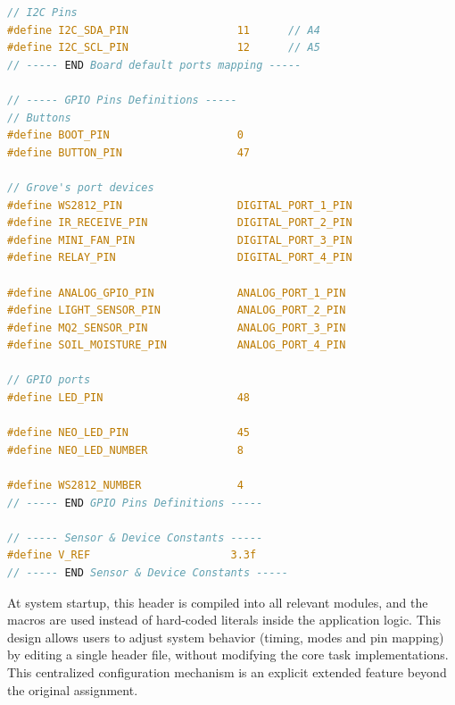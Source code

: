 \begin{lstlisting}[language=C,caption={Excerpt of configuration macros}]
// I2C Pins
#define I2C_SDA_PIN                 11      // A4
#define I2C_SCL_PIN                 12      // A5
// ----- END Board default ports mapping -----

// ----- GPIO Pins Definitions -----
// Buttons
#define BOOT_PIN                    0
#define BUTTON_PIN                  47

// Grove's port devices
#define WS2812_PIN                  DIGITAL_PORT_1_PIN
#define IR_RECEIVE_PIN              DIGITAL_PORT_2_PIN
#define MINI_FAN_PIN                DIGITAL_PORT_3_PIN
#define RELAY_PIN                   DIGITAL_PORT_4_PIN

#define ANALOG_GPIO_PIN             ANALOG_PORT_1_PIN
#define LIGHT_SENSOR_PIN            ANALOG_PORT_2_PIN
#define MQ2_SENSOR_PIN              ANALOG_PORT_3_PIN
#define SOIL_MOISTURE_PIN           ANALOG_PORT_4_PIN

// GPIO ports
#define LED_PIN                     48

#define NEO_LED_PIN                 45
#define NEO_LED_NUMBER              8

#define WS2812_NUMBER               4
// ----- END GPIO Pins Definitions -----

// ----- Sensor & Device Constants -----
#define V_REF                      3.3f
// ----- END Sensor & Device Constants -----
\end{lstlisting}

At system startup, this header is compiled into all relevant modules, and the macros are used instead of hard-coded literals inside the application logic. This design allows users to adjust system behavior (timing, modes and pin mapping) by editing a single header file, without modifying the core task implementations. This centralized configuration mechanism is an explicit extended feature beyond the original assignment.
